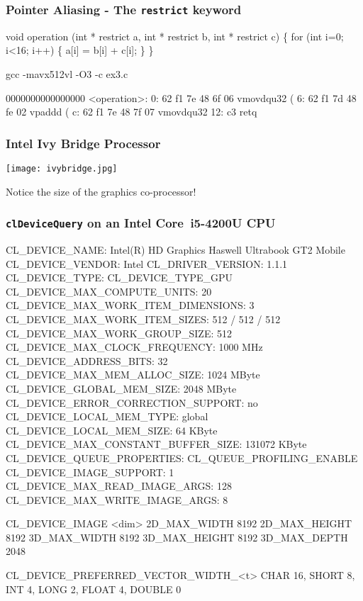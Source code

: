 \documentclass{beamer}
\begin{document}
\begin{frame}[fragile]
\frametitle{Pointer Aliasing - The {\tt restrict} keyword}
\begin{semiverbatim}
\tiny
void operation (int * restrict a, int * restrict b, int * restrict c)
\{
  for (int i=0; i<16; i++) \{
    a[i] = b[i] + c[i];
  \}
\}


gcc -mavx512vl -O3 -c ex3.c

0000000000000000 <operation>:
   0:   62 f1 7e 48 6f 06       vmovdqu32 (%
   6:   62 f1 7d 48 fe 02       vpaddd (%
   c:   62 f1 7e 48 7f 07       vmovdqu32 %
  12:   c3                      retq   

\end{semiverbatim}
\end{frame}

\begin{frame}
\frametitle{Intel Ivy Bridge Processor}
\texttt{[image: ivybridge.jpg]}
\begin{center}
\huge
Notice the size of the graphics co-processor!
\end{center}
\end{frame}

\begin{frame}[fragile]
\frametitle{{\tt clDeviceQuery} on an Intel\textsuperscript{\textregistered} Core\texttrademark\ i5-4200U CPU}
\begin{semiverbatim}
\tiny
  CL_DEVICE_NAME:                       Intel(R) HD Graphics Haswell Ultrabook GT2 Mobile
  CL_DEVICE_VENDOR:                     Intel
  CL_DRIVER_VERSION:                    1.1.1
  CL_DEVICE_TYPE:                       CL_DEVICE_TYPE_GPU
  CL_DEVICE_MAX_COMPUTE_UNITS:          20
  CL_DEVICE_MAX_WORK_ITEM_DIMENSIONS:   3
  CL_DEVICE_MAX_WORK_ITEM_SIZES:        512 / 512 / 512 
  CL_DEVICE_MAX_WORK_GROUP_SIZE:        512
  CL_DEVICE_MAX_CLOCK_FREQUENCY:        1000 MHz
  CL_DEVICE_ADDRESS_BITS:               32
  CL_DEVICE_MAX_MEM_ALLOC_SIZE:         1024 MByte
  CL_DEVICE_GLOBAL_MEM_SIZE:            2048 MByte
  CL_DEVICE_ERROR_CORRECTION_SUPPORT:   no
  CL_DEVICE_LOCAL_MEM_TYPE:             global
  CL_DEVICE_LOCAL_MEM_SIZE:             64 KByte
  CL_DEVICE_MAX_CONSTANT_BUFFER_SIZE:   131072 KByte
  CL_DEVICE_QUEUE_PROPERTIES:           CL_QUEUE_PROFILING_ENABLE
  CL_DEVICE_IMAGE_SUPPORT:              1
  CL_DEVICE_MAX_READ_IMAGE_ARGS:        128
  CL_DEVICE_MAX_WRITE_IMAGE_ARGS:       8

  CL_DEVICE_IMAGE <dim>                 2D_MAX_WIDTH     8192
                                        2D_MAX_HEIGHT    8192
                                        3D_MAX_WIDTH     8192
                                        3D_MAX_HEIGHT    8192
                                        3D_MAX_DEPTH     2048

  CL_DEVICE_PREFERRED_VECTOR_WIDTH_<t>  CHAR 16, SHORT 8, INT 4, LONG 2, FLOAT 4, DOUBLE 0
\end{semiverbatim}
\end{frame}
\end{document}
